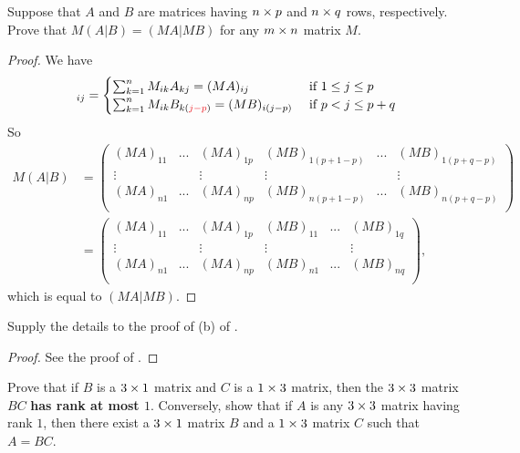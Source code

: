 \begin{exercise} \label{exercise 3.2.15}
Suppose that \(A\) and \(B\) are matrices having \(n \times p\) and \(n \times q\) rows, respectively.
Prove that \(M(A|B) = (MA|MB)\) for any \(m \times n\) matrix \(M\).
\end{exercise}

\begin{proof}
We have
\begin{equation*}
    [M(A | B)]_{ij} =
    \begin{cases}
        \sum_{k = 1}^n M_{ik} A_{kj} = (MA)_{ij} & \text{ if } 1 \le j \le p \\
        \sum_{k = 1}^n M_{ik} B_{k(\RED{j - p})} = (MB)_{i(j - p)} & \text{ if } p < j \le p + q \\
    \end{cases}
\end{equation*}
So
\begin{align*}
    M(A | B) & = \left(\begin{array}{lll|lll}
        (MA)_{11} & ... & (MA)_{1p} & (MB)_{1(p+1-p)} & ... & (MB)_{1(p+q-p)} \\
        \vdots    &     & \vdots    & \vdots          &     & \vdots \\
        (MA)_{n1} & ... & (MA)_{np} & (MB)_{n(p+1-p)} & ... & (MB)_{n(p+q-p)} \\
    \end{array}\right) \\
             & = \left(\begin{array}{lll|lll}
        (MA)_{11} & ... & (MA)_{1p} & (MB)_{11} & ... & (MB)_{1q} \\
        \vdots    &     & \vdots    & \vdots          &     & \vdots \\
        (MA)_{n1} & ... & (MA)_{np} & (MB)_{n1} & ... & (MB)_{nq} \\
    \end{array}\right),
\end{align*}
which is equal to \((MA|MB)\).
\end{proof}

\begin{exercise} \label{exercise 3.2.16}
Supply the details to the proof of (b) of .
\end{exercise}

\begin{proof}
See the proof of .
\end{proof}

\begin{exercise} \label{exercise 3.2.17}
Prove that if \(B\) is a \(3 \times 1\) matrix and \(C\) is a \(1 \times 3\) matrix, then the \(3 \times 3\) matrix \(BC\) \textbf{has rank at most \(1\)}.
Conversely, show that if \(A\) is any \(3 \times 3\) matrix having rank \(1\), then there exist a \(3 \times 1\) matrix \(B\) and a \(1 \times 3\) matrix \(C\) such that \(A = BC\).
\end{exercise}

